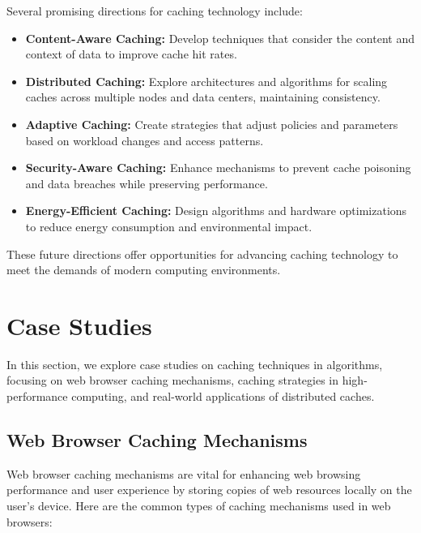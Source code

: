 \documentclass[12pt]{book} %
\begin{document}
Several promising directions for caching technology include:

\begin{itemize}
    \item \textbf{Content-Aware Caching:} Develop techniques that consider the content and context of data to improve cache hit rates.
    \item \textbf{Distributed Caching:} Explore architectures and algorithms for scaling caches across multiple nodes and data centers, maintaining consistency.
    \item \textbf{Adaptive Caching:} Create strategies that adjust policies and parameters based on workload changes and access patterns.
    \item \textbf{Security-Aware Caching:} Enhance mechanisms to prevent cache poisoning and data breaches while preserving performance.
    \item \textbf{Energy-Efficient Caching:} Design algorithms and hardware optimizations to reduce energy consumption and environmental impact.
\end{itemize}

These future directions offer opportunities for advancing caching technology to meet the demands of modern computing environments.



\section{Case Studies}

In this section, we explore case studies on caching techniques in algorithms, focusing on web browser caching mechanisms, caching strategies in high-performance computing, and real-world applications of distributed caches.

\subsection{Web Browser Caching Mechanisms}

Web browser caching mechanisms are vital for enhancing web browsing performance and user experience by storing copies of web resources locally on the user's device. Here are the common types of caching mechanisms used in web browsers:
\end{document}
